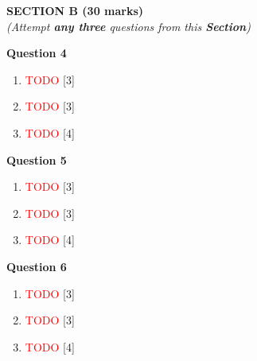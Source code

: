 \newpage
\begin{center}
   \large
   \textbf{SECTION B (30 marks)}\\
   \vspace{5mm}
   \normalsize
   \textit{(Attempt \textbf{any three} questions from this \textbf{Section})}
\end{center}
\par

\noindent
\textbf{Question 4}
\begin{enumerate}[label=(\roman*)]

    \item \textcolor{red}{TODO} \hfill [3]

    \item \textcolor{red}{TODO} \hfill [3]

    \item \textcolor{red}{TODO} \hfill [4]

\end{enumerate}

\noindent
\textbf{Question 5}
\begin{enumerate}[label=(\roman*)]

    \item \textcolor{red}{TODO} \hfill [3]

    \item \textcolor{red}{TODO} \hfill [3]

    \item \textcolor{red}{TODO} \hfill [4]

\end{enumerate}

\noindent
\textbf{Question 6}
\begin{enumerate}[label=(\roman*)]

    \item \textcolor{red}{TODO} \hfill [3]

    \item \textcolor{red}{TODO} \hfill [3]

    \item \textcolor{red}{TODO} \hfill [4]

\end{enumerate}

